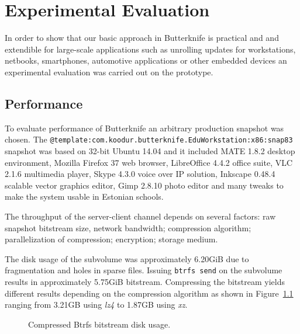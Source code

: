 \documentclass[a4paper,11pt]{kth-mag}
\begin{document}
%
%
%
%
\chapter{Experimental Evaluation}
\label{chap:evaluation}
In order to show that our basic approach in Butterknife is practical and
and extendible for large-scale applications such as unrolling
updates for workstations, netbooks, smartphones,
automotive applications or other embedded devices
an experimental evaluation was carried out on the prototype.




\section{Performance}

To evaluate performance of Butterknife an arbitrary
production snapshot was chosen.
The \lstinline!@template:com.koodur.butterknife.EduWorkstation:x86:snap83!
snapshot was based on 32-bit Ubuntu 14.04 and
it included MATE 1.8.2 desktop environment, Mozilla Firefox 37 web browser,
LibreOffice 4.4.2 office suite,
VLC 2.1.6 multimedia player,
Skype 4.3.0 voice over IP solution,
Inkscape 0.48.4 scalable vector graphics editor,
Gimp 2.8.10 photo editor and many tweaks
to make the system usable in Estonian schools.

The throughput of the server-client channel depends on
several factors:
raw snapshot bitstream size,
network bandwidth;
compression algorithm;
parallelization of compression;
encryption;
storage medium.

The disk usage of the
subvolume was approximately 6.20GiB
due to fragmentation and holes in sparse files.
Issuing \lstinline!btrfs send! on the subvolume
results in approximately 5.75GiB bitstream.
Compressing the bitstream yields different
results depending on the compression algorithm as
shown in Figure~\ref{chart:resulting-file-size}
ranging from 3.21GB using \emph{lz4} to
1.87GB using \emph{xz}.

\begin{figure}
\caption{Compressed Btrfs bitstream disk usage.}
\label{chart:resulting-file-size}
\end{figure}
\end{document}
